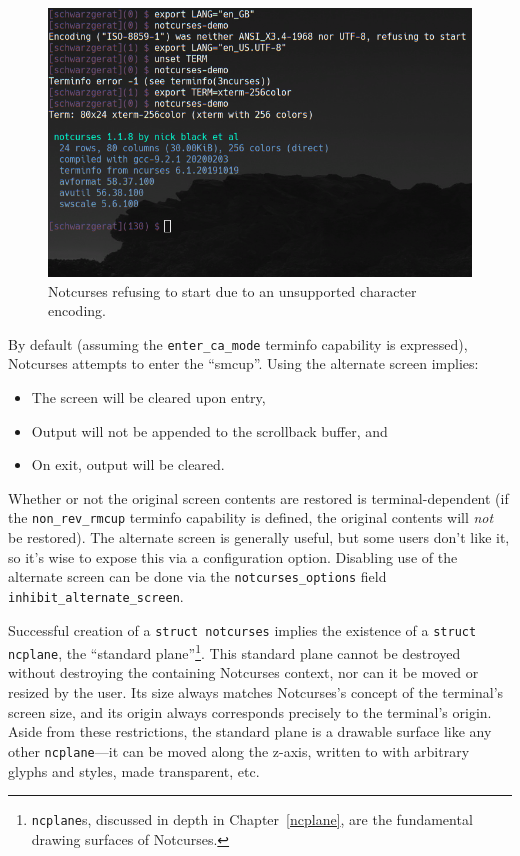 \documentclass[letterpaper,10pt]{article}
\newenvironment{denseitemize}{
  \begin{itemize}
      \setlength{\itemsep}{0pt}
}{
  \end{itemize}
}
\begin{document}
\begin{figure}[!htbp]
\centering \includegraphics[width=.7\linewidth]{media/notcurses-init-fails.png}
\caption{Notcurses refusing to start due to an unsupported character encoding.}
\label{fig:encodingfail}
\end{figure}

By default (assuming the \texttt{enter\_ca\_mode} terminfo capability is expressed),
Notcurses attempts to enter the ``\gls{smcup}''. Using the alternate screen
implies:
\begin{denseitemize}
\item{The screen will be cleared upon entry,}
\item{Output will not be appended to the scrollback buffer, and}
\item{On exit, output will be cleared.}
\end{denseitemize}
Whether or not the original screen contents are restored is terminal-dependent
(if the \texttt{non\_rev\_rmcup} terminfo capability is defined, the original
contents will \textit{not} be restored). The alternate screen is generally
useful, but some users don't like it, so it's wise to expose this via a
configuration option. Disabling use of the alternate screen can be done via the
\texttt{notcurses\_options} field \texttt{inhibit\_alternate\_screen}.

Successful creation of a \texttt{struct notcurses} implies the existence of
a \texttt{struct ncplane}, the ``standard plane''\footnote{\texttt{ncplane}s,
discussed in depth in Chapter~\ref{ncplane}, are the fundamental drawing surfaces of Notcurses.}.
This standard plane cannot be destroyed without destroying the containing
Notcurses context, nor can it be moved or resized by the user. Its size always
matches Notcurses's concept of the terminal's screen size, and its origin
always corresponds precisely to the terminal's origin. Aside from these
restrictions, the standard plane is a drawable surface like any other
\texttt{ncplane}---it can be moved along the z-axis, written to with arbitrary
glyphs and styles, made transparent, etc.
\end{document}
